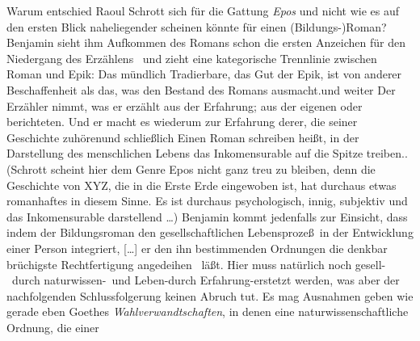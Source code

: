Warum entschied Raoul Schrott sich für die Gattung \emph{Epos} und nicht wie
  es auf den ersten Blick naheliegender scheinen könnte für einen
  (Bildungs-)Roman?
Benjamin sieht ihm Aufkommen des Romans schon die ersten Anzeichen für den
  \glqq Niedergang des Erzählens\grqq\ \citep[389]{Benjamin1936Erzaehler} und
  zieht eine kategorische Trennlinie zwischen Roman und Epik:
  \glqq Das mündlich Tradierbare, das Gut der Epik, ist von anderer
  Beschaffenheit als das, was den Bestand des Romans ausmacht.\grqq und
  weiter \glqq Der Erzähler nimmt, was er erzählt aus der Erfahrung; aus der
  eigenen oder berichteten. Und er macht es wiederum zur Erfahrung derer, die
  seiner Geschichte zuhören\grqq und schlie\ss lich \glqq Einen Roman schreiben
  hei\ss t, in der Darstellung des menschlichen Lebens das Inkomensurable auf
  die Spitze treiben.\grqq.
(Schrott scheint hier dem Genre Epos nicht ganz treu zu bleiben, denn \zB die
  Geschichte von XYZ, die in die Erste Erde eingewoben ist, hat durchaus etwas
  romanhaftes in diesem Sinne. Es ist durchaus psychologisch, innig, subjektiv
  und das Inkomensurable darstellend \ldots)
Benjamin kommt jedenfalls zur Einsicht, dass indem der Bildungsroman \glqq den
  gesellschaftlichen Lebensproze\ss\ in der Entwicklung einer Person integriert,
  [\ldots] er den ihn bestimmenden Ordnungen die denkbar brüchigste
  Rechtfertigung angedeihen\grqq\ \citep[ebd.]{Benjamin1936Erzaehler} lä\ss t.
Hier muss natürlich noch \glqq gesell-\grqq\ durch \glqq
  naturwissen-\grqq\ und \glqq Leben-\grqq durch \glqq Erfahrung-\grqq erstetzt
  werden, was aber der nachfolgenden Schlussfolgerung keinen Abruch tut.
Es mag Ausnahmen geben wie gerade eben Goethes \emph{Wahlverwandtschaften},
  in denen eine naturwissenschaftliche Ordnung, die einer 
